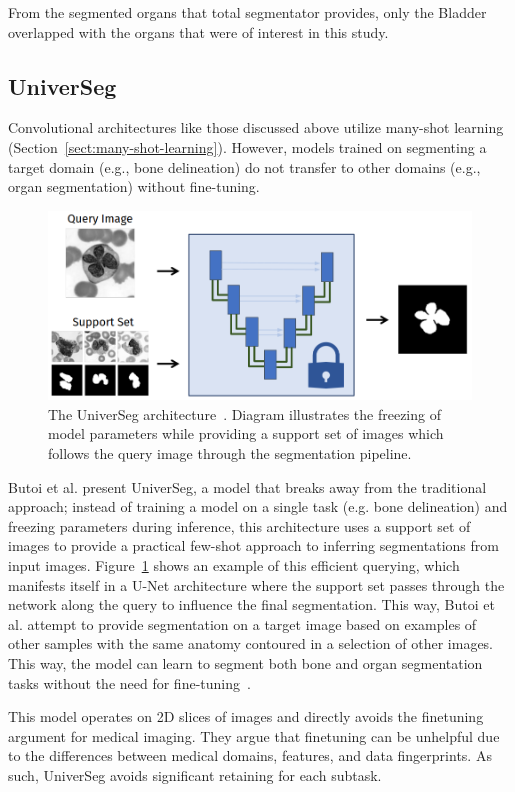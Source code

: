 \documentclass[12pt,twoside]{report}
\begin{document}
From the segmented organs that total segmentator provides, only the Bladder overlapped with the organs that were of interest in this study.

\subsection{UniverSeg}\label{sect:universeg}

Convolutional architectures like those discussed above utilize many-shot learning (Section~\ref{sect:many-shot-learning}). However, models trained on segmenting a target domain (e.g., bone delineation) do not transfer to other domains (e.g., organ segmentation) without fine-tuning.

\begin{figure}[H]
  \centering
  \includegraphics[width=.5\linewidth]{../figures/universeg.png}
  \caption{The UniverSeg architecture~\cite{universeg}. Diagram illustrates the freezing of model parameters while providing a support set of images which follows the query image through the segmentation pipeline.}\label{fig:universeg}
\end{figure}

Butoi et al. present UniverSeg, a model that breaks away from the traditional approach; instead of training a model on a single task (e.g. bone delineation) and freezing parameters during inference, this architecture uses a support set of images to provide a practical few-shot approach to inferring segmentations from input images. Figure~\ref{fig:universeg} shows an example of this efficient querying, which manifests itself in a U-Net architecture where the support set passes through the network along the query to influence the final segmentation. This way, Butoi et al. attempt to provide segmentation on a target image based on examples of other samples with the same anatomy contoured in a selection of other images. This way, the model can learn to segment both bone and organ segmentation tasks without the need for fine-tuning~\cite{universeg}.

This model operates on 2D slices of images and directly avoids the finetuning argument for medical imaging. They argue that finetuning can be unhelpful due to the differences between medical domains, features, and data fingerprints. As such, UniverSeg avoids significant retaining for each subtask.
\end{document}
